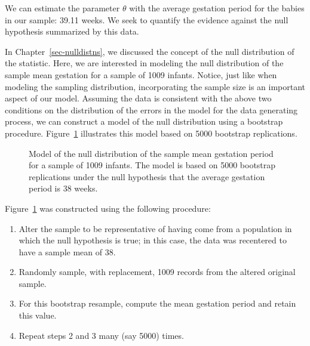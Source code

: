 \documentclass[
  letterpaper,
  DIV=11,
  numbers=noendperiod]{scrreprt}
\providecommand{\tightlist}{%
  \setlength{\itemsep}{0pt}\setlength{\parskip}{0pt}}\usepackage{longtable,booktabs,array}
\theoremstyle{plain}
\theoremstyle{definition}
\theoremstyle{definition}
\theoremstyle{remark}
\begin{document}
We can estimate the parameter \(\theta\) with the average gestation
period for the babies in our sample: 39.11 weeks. We seek to quantify
the evidence against the null hypothesis summarized by this data.

In Chapter~\ref{sec-nulldistns}, we discussed the concept of the null
distribution of the statistic. Here, we are interested in modeling the
null distribution of the sample mean gestation for a sample of 1009
infants. Notice, just like when modeling the sampling distribution,
incorporating the sample size is an important aspect of our model.
Assuming the data is consistent with the above two conditions on the
distribution of the errors in the model for the data generating process,
we can construct a model of the null distribution using a bootstrap
procedure. Figure~\ref{fig-teststat-null-mean} illustrates this model
based on 5000 bootstrap replications.

\begin{figure}


\caption{\label{fig-teststat-null-mean}Model of the null distribution of
the sample mean gestation period for a sample of 1009 infants. The model
is based on 5000 bootstrap replications under the null hypothesis that
the average gestation period is 38 weeks.}

\end{figure}%

Figure~\ref{fig-teststat-null-mean} was constructed using the following
procedure:

\begin{enumerate}
\def\labelenumi{\arabic{enumi}.}
\tightlist
\item
  Alter the sample to be representative of having come from a population
  in which the null hypothesis is true; in this case, the data was
  recentered to have a sample mean of 38.
\item
  Randomly sample, with replacement, 1009 records from the altered
  original sample.
\item
  For this bootstrap resample, compute the mean gestation period and
  retain this value.
\item
  Repeat steps 2 and 3 many (say 5000) times.
\end{enumerate}
\end{document}
